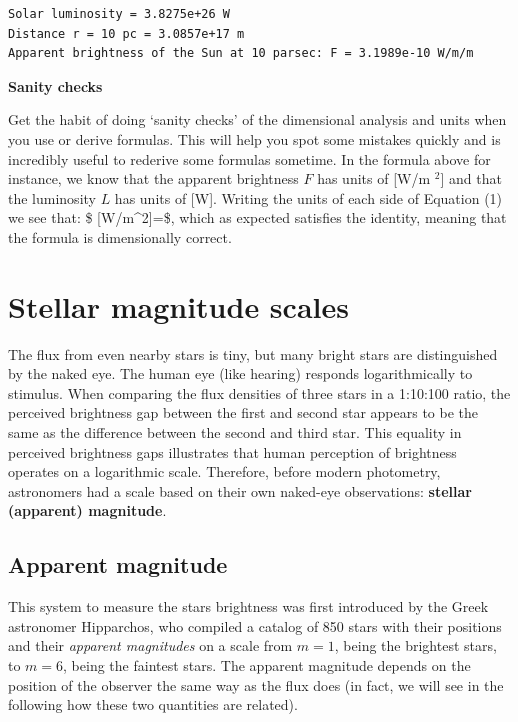 \documentclass[
  letterpaper,
  DIV=11,
  numbers=noendperiod]{scrreprt}
\begin{document}
\begin{verbatim}
Solar luminosity = 3.8275e+26 W
Distance r = 10 pc = 3.0857e+17 m
Apparent brightness of the Sun at 10 parsec: F = 3.1989e-10 W/m/m
\end{verbatim}

\textbf{Sanity checks}

Get the habit of doing `sanity checks' of the dimensional analysis and
units when you use or derive formulas. This will help you spot some
mistakes quickly and is incredibly useful to rederive some formulas
sometime. In the formula above for instance, we know that the apparent
brightness \(F\) has units of {[}W/m \(^2\){]} and that the luminosity
\(L\) has units of {[}W{]}. Writing the units of each side of Equation
(1) we see that: \$ {[}W/m\^{}2{]}=\dfrac{[W]}{[m^2]}\$, which as
expected satisfies the identity, meaning that the formula is
dimensionally correct.

\hypertarget{stellar-magnitude-scales}{%
\section{Stellar magnitude scales}\label{stellar-magnitude-scales}}

The flux from even nearby stars is tiny, but many bright stars are
distinguished by the naked eye. The human eye (like hearing) responds
logarithmically to stimulus. When comparing the flux densities of three
stars in a 1:10:100 ratio, the perceived brightness gap between the
first and second star appears to be the same as the difference between
the second and third star. This equality in perceived brightness gaps
illustrates that human perception of brightness operates on a
logarithmic scale. Therefore, before modern photometry, astronomers had
a scale based on their own naked-eye observations: \textbf{stellar
(apparent) magnitude}.

\hypertarget{apparent-magnitude}{%
\subsection{Apparent magnitude}\label{apparent-magnitude}}

This system to measure the stars brightness was first introduced by the
Greek astronomer Hipparchos, who compiled a catalog of 850 stars with
their positions and their \emph{apparent magnitudes} on a scale from
\(m=1\), being the brightest stars, to \(m=6\), being the faintest
stars. The apparent magnitude depends on the position of the observer
the same way as the flux does (in fact, we will see in the following how
these two quantities are related).
\end{document}
